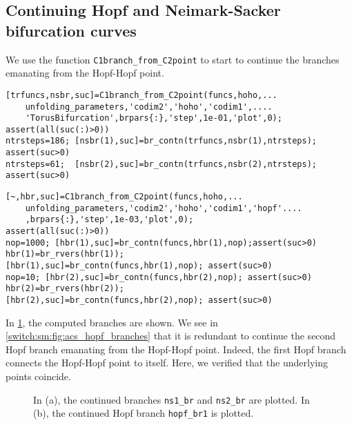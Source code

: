 \subsection{Continuing Hopf and Neimark-Sacker bifurcation curves}
We use the function \lstinline|C1branch_from_C2point| to start to continue the branches emanating from the Hopf-Hopf point.
\begin{lstlisting}[style=customMatlab]
%% Continue Neimark-Sacker curves emanating from Hopf-Hopf point
[trfuncs,nsbr,suc]=C1branch_from_C2point(funcs,hoho,...
    unfolding_parameters,'codim2','hoho','codim1',....
    'TorusBifurcation',brpars{:},'step',1e-01,'plot',0);
assert(all(suc(:)>0))
ntrsteps=186; [nsbr(1),suc]=br_contn(trfuncs,nsbr(1),ntrsteps);
assert(suc>0)
ntrsteps=61;  [nsbr(2),suc]=br_contn(trfuncs,nsbr(2),ntrsteps);
assert(suc>0)
\end{lstlisting}
\begin{lstlisting}[style=customMatlab]
%% Continue Hopf curve emanating from Hopf-Hopf point
[~,hbr,suc]=C1branch_from_C2point(funcs,hoho,...
    unfolding_parameters,'codim2','hoho','codim1','hopf'....
    ,brpars{:},'step',1e-03,'plot',0);
assert(all(suc(:)>0))
nop=1000; [hbr(1),suc]=br_contn(funcs,hbr(1),nop);assert(suc>0)
hbr(1)=br_rvers(hbr(1));
[hbr(1),suc]=br_contn(funcs,hbr(1),nop); assert(suc>0)
nop=10; [hbr(2),suc]=br_contn(funcs,hbr(2),nop); assert(suc>0)
hbr(2)=br_rvers(hbr(2));
[hbr(2),suc]=br_contn(funcs,hbr(2),nop); assert(suc>0)
\end{lstlisting}
In \cref{switch:sm:fig:continued_branches}, the computed branches are shown. We see in \cref{switch:sm:fig:acs_hopf_branches} that it is redundant to continue the second Hopf branch emanating from the Hopf-Hopf point. Indeed, the first Hopf branch connects the Hopf-Hopf point to itself. Here, we verified that the underlying points coincide.
\begin{figure}
\hfill
{}
\caption{In \textup{(a)}, the continued branches \lstinline|ns1_br| and \lstinline|ns2_br| are plotted. In \textup{(b)}, the continued Hopf branch \lstinline|hopf_br1| is plotted.}
\label{switch:sm:fig:continued_branches}
\end{figure}

